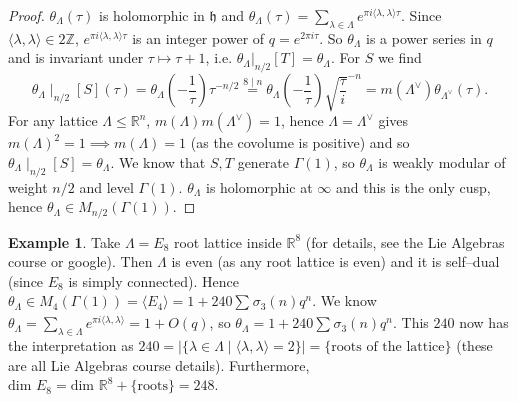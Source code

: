 \documentclass{article}
\theoremstyle{definition}
\newtheorem{example}{Example}[section]
\begin{document}
\begin{proof}
    $\theta_{\Lambda}(\tau)$ is holomorphic in $\mathfrak{h}$ and $\theta_{\Lambda}(\tau) = \sum_{\lambda \in \Lambda}^{} e^{\pi i \langle \lambda, \lambda \rangle \tau}$. Since $\langle \lambda, \lambda \rangle \in 2\mathbb{Z}$, $e^{ \pi i \langle \lambda, \lambda \rangle \tau}$ is an integer power of $q = e^{2\pi i \tau}$. So $\theta_{\Lambda}$ is a power series in $q$ and is invariant under $\tau \mapsto \tau+1$, i.e. $\theta_{\Lambda}|_{n/2}[T] = \theta_\Lambda$. For $S$ we find $$\theta_\Lambda \mid_{n/2}[S](\tau) = \theta_\Lambda \left(-\frac{1}{\tau}\right) \tau^{-n/2} \stackrel{8 \mid n}{=} \theta_\Lambda \left(-\frac{1}{\tau}\right) \sqrt{\frac{\tau}{i}}^{-n} = m(\Lambda^\vee)\theta_{\Lambda^{\vee}}(\tau).$$  
    For any lattice $\Lambda \le \mathbb{R}^n$, $m(\Lambda)m(\Lambda^\vee)=1$, hence $\Lambda = \Lambda^{\vee}$ gives $m(\Lambda)^2=1 \implies m(\Lambda)=1$ (as the covolume is positive) and so $\theta_\Lambda \mid_{n/2}[S]=\theta_\Lambda$. We know that $S, T$ generate $\Gamma(1)$, so $\theta_{\Lambda}$ is weakly modular of weight $n/2$ and level $\Gamma(1)$. $\theta_\Lambda$ is holomorphic at $\infty$ and this is the only cusp, hence $\theta_\Lambda \in M_{n/2}(\Gamma(1))$.
\end{proof}
\begin{example}
    Take $\Lambda = E_8$ root lattice inside $\mathbb{R}^8$ (for details, see the Lie Algebras course or google). Then $\Lambda$ is even (as any root lattice is even) and it is self--dual (since $E_8$ is simply connected). Hence $\theta_\Lambda \in M_{4}(\Gamma(1)) = \langle E_4 \rangle = 1 + 240\sum_{}^{} \sigma_3(n)q^n$. We know $\theta_{\Lambda} = \sum_{\lambda \in \Lambda}^{} e^{\pi i \langle \lambda, \lambda \rangle} = 1 + O(q)$, so $\theta_\Lambda = 1 + 240\sum_{}^{} \sigma_3(n)q^n$. This $240$ now has the interpretation as $240 = |\{\lambda \in \Lambda \mid \langle \lambda, \lambda \rangle = 2\}| = \{\text{roots of the lattice}\}$ (these are all Lie Algebras course details). Furthermore, $\text{dim }E_8 = \text{dim }\mathbb{R}^8 + \{\text{roots}\} = 248$.
\end{example}
\end{document}
